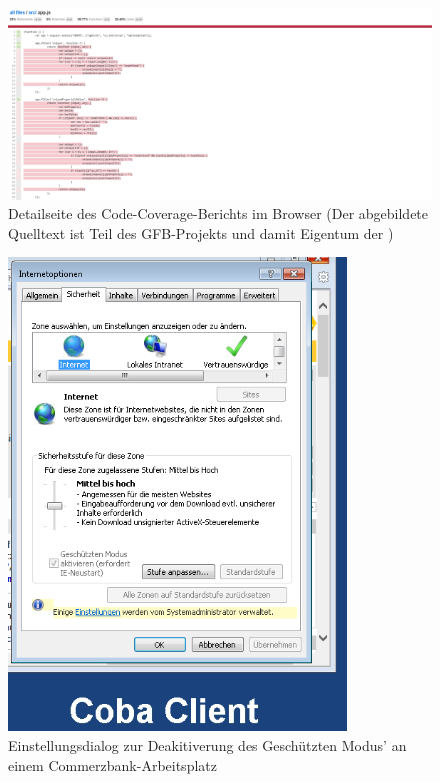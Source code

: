 \begin{figure}[H]
	\includegraphics[width=\textwidth]{abb/code-cov-2.png}
	\caption[Detailseite des Code-Coverage-Berichts im Browser]{Detailseite des Code-Coverage-Berichts im Browser (Der abgebildete Quelltext ist Teil des GFB-Projekts und damit Eigentum der \domain)}
	\label{abb:code-cov-2}
\end{figure}

\begin{figure}[H]
	\includegraphics[width=0.8\textwidth]{abb/coba-ie.png}
	\caption{Einstellungsdialog zur Deakitiverung des Geschützten Modus' an einem Commerzbank-Arbeitsplatz}
	\label{abb:coba-ie}
\end{figure}